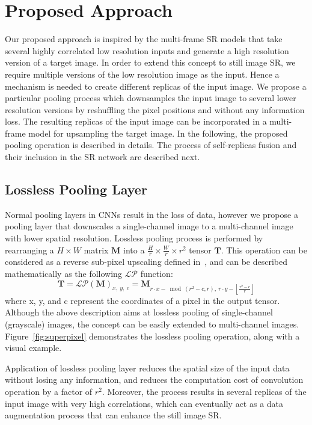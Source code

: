 \documentclass[10pt,twocolumn,letterpaper]{article}
\begin{document}
\section{Proposed Approach}
\label{proposed}
Our proposed approach is inspired by the multi-frame SR models that take several highly 
correlated low resolution inputs and generate a high resolution version of a target image. In
order to extend this concept to still image SR, we require multiple versions of the low resolution
image as the input. Hence a mechanism is needed to create different replicas of the input 
image. We propose a particular pooling process which downsamples the input image to several lower
resolution versions by reshuffling the pixel positions and without any information loss. The resulting
replicas of the input image can be incorporated in a multi-frame model for upsampling the target image.
In the following, the proposed pooling operation is described in details. The process of self-replicas
fusion and their inclusion in the SR network are described next.

\subsection{Lossless Pooling Layer}
\label{sec:superpixel}

Normal pooling layers in CNNs result in the loss of data, however we propose
a pooling layer that downscales a single-channel image to a multi-channel image with lower spatial resolution.
Lossless pooling process is performed by rearranging a $H \times W$ matrix $\mathbf{M}$ into
a $\frac{H}{r} \times \frac{W}{r} \times r^2$ tensor $\mathbf{T}$. This operation can be considered
as a reverse sub-pixel upscaling defined in~\cite{shi2016}, and can be described mathematically
as the following $\mathcal{LP}$ function:
\begin{equation}
\label{eq:1}
\mathbf{T} = {\mathcal{LP}(\mathbf{M})}_{x,\ y,\ c} = \mathbf{M}_{r\cdot x -\bmod(r^2 - c, r),\ r\cdot y - \left \lfloor \frac{r^2-c}{r} \right \rfloor}
\end{equation}
where x, y, and c represent the coordinates of a pixel in the output tensor. Although the
above description aims at lossless pooling of single-channel (grayscale) images, the
concept can be easily extended to multi-channel images. Figure~\ref{fig:superpixel}
demonstrates the lossless pooling operation, along with a visual example.

Application of lossless pooling layer reduces the spatial size of the input data without
losing any information, and reduces the computation cost of convolution operation by a factor
of $r^2$. Moreover, the process results in several replicas of the input image
with very high correlations, which can eventually act as a data augmentation process that can 
enhance the still image SR.
\end{document}
